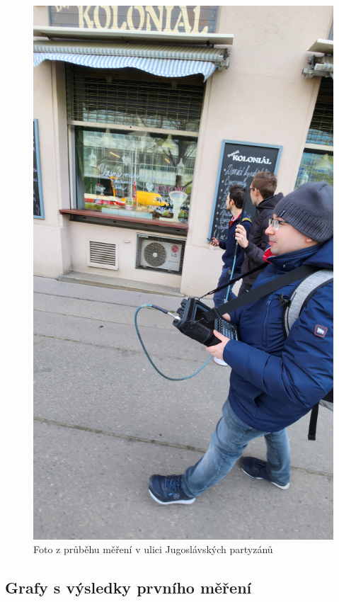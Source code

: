 \begin{figure}[h!]
    \centering
    \includegraphics[angle=270,scale=0.07]{img/Foto z průběhu měření v ulici Jugoslávských partyzánů.jpg}
    \caption{Foto z průběhu měření v ulici Jugoslávských partyzánů}
    \label{fig:my_label}
\end{figure}

\subsection{Grafy s výsledky prvního měření}

